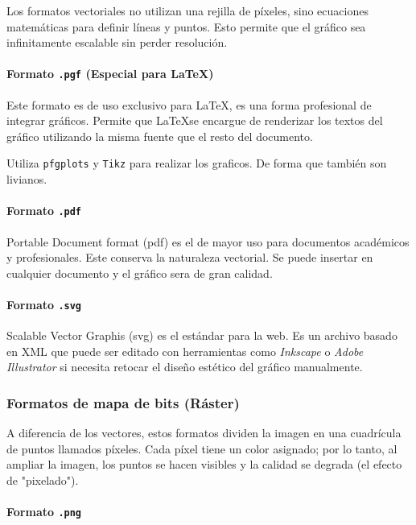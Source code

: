 Los formatos vectoriales no utilizan una rejilla de píxeles, sino ecuaciones matemáticas para definir líneas y puntos. Esto permite que el gráfico sea infinitamente escalable sin perder resolución.

\paragraph{Formato \texttt{.pgf} (Especial para \LaTeX)}

Este formato es de uso exclusivo para \LaTeX, es una forma profesional de integrar gráficos. Permite que \LaTeX se encargue de renderizar los textos del gráfico utilizando la misma fuente que el resto del documento. 

Utiliza \texttt{pfgplots} y \texttt{Tikz} para realizar los graficos. De forma que también son livianos.

\paragraph{Formato \texttt{.pdf}}

Portable Document format (pdf) es el de mayor uso para documentos académicos y profesionales. Este conserva la naturaleza vectorial. Se puede insertar en cualquier documento y el gráfico sera de gran calidad.

\paragraph{Formato \texttt{.svg}}

Scalable Vector Graphis (svg) es el estándar para la web. Es un archivo basado en XML que puede ser editado con herramientas como \textit{Inkscape} o \textit{Adobe Illustrator} si necesita retocar el diseño estético del gráfico manualmente.


\subsubsection{Formatos de mapa de bits (Ráster)}

A diferencia de los vectores, estos formatos dividen la imagen en una cuadrícula de puntos llamados píxeles. Cada píxel tiene un color asignado; por lo tanto, al ampliar la imagen, los puntos se hacen visibles y la calidad se degrada (el efecto de "pixelado").

\paragraph{Formato \texttt{.png}}

